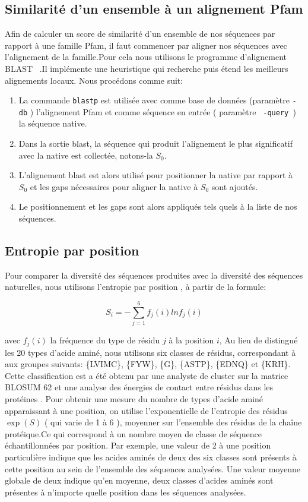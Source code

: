\subsection{Similarité d'un ensemble à un alignement Pfam}
\label{SimPfam}
Afin de calculer un score de similarité d'un ensemble de nos séquences par rapport à une famille Pfam, il faut commencer par aligner nos séquences avec l'alignement de la famille.Pour cela nous utilisons le programme d'alignement BLAST ~\citep{refBLAST}.Il implémente une heuristique qui recherche puis étend les meilleurs alignements locaux. Nous procédons comme suit:
\begin{enumerate}
\item La commande \verb!blastp! est utilisée avec comme base de données (paramètre \verb!-db! ) l'alignement Pfam et comme séquence en entrée ( paramètre \verb! -query !) la séquence native. 
\item Dans la sortie blast, la séquence qui produit l'alignement le plus significatif avec la native est collectée, notons-la $S_0$. 
\item L'alignement blast est alors utilisé pour positionner la native par rapport à $S_0$ et les gaps nécessaires pour aligner la native à $S_0$ sont ajoutés.
\item Le positionnement et les gaps sont alors appliqués tels quels à la liste de nos séquences.

\end{enumerate}

\subsection{Entropie par position}
\label{subsection:Entropie}
Pour comparer la diversité des séquences produites avec la diversité des séquences naturelles, nous utilisons l'entropie par position \cite{DurbinBK}, à partir de la formule:

\begin{equation} \label{eq:entropy}
  S_i = - \sum_{j=1}^6 f_j(i)lnf_j(i)
\end{equation} 


avec $f_j(i)$ la fréquence du type de résidu $j$ à la position $i$, Au lieu de distingué les 20 types d'acide aminé, nous utilisons six classes de résidus, correspondant à  aux groupes suivants: \{LVIMC\}, \{FYW\}, \{G\}, \{ASTP\}, \{EDNQ\} et \{KRH\}. Cette classification est a été obtenu par une analyste de cluster  sur la matrice BLOSUM 62 \label{eq:entropy} et une analyse  des énergies de contact entre résidus dans les protéines \cite{Launay07} . Pour obtenir une mesure du nombre de types d'acide aminé apparaissant à une position, on utilise l'exponentielle de l'entropie des résidus $\exp(S)$ ( qui varie de 1 à 6 ), moyenner sur l'ensemble des résidus de la chaîne protéique.Ce qui correspond à un nombre moyen de classe de séquence échantillonnées par position. Par exemple, une valeur de 2 à une position particulière indique que les acides aminés de deux des six classes sont présents à cette position au sein de l'ensemble des séquences analysées. Une valeur moyenne globale de deux indique qu'en moyenne, deux classes d'acides aminés sont présentes à n'importe quelle position dans les séquences analysées.


